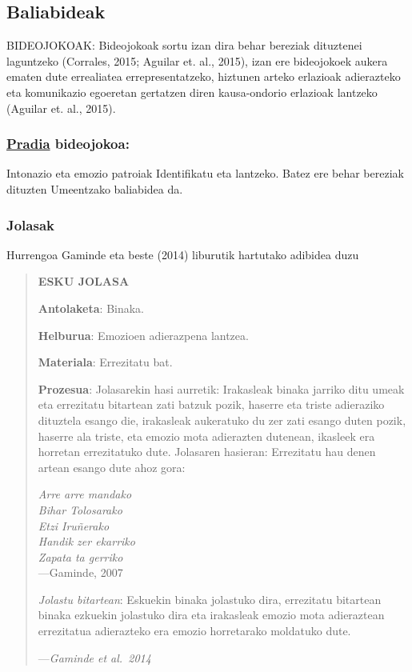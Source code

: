 \documentclass[]{book}
\begin{document}
\hypertarget{baliabideak}{%
\subsection{Baliabideak}\label{baliabideak}}

BIDEOJOKOAK: Bideojokoak sortu izan dira behar bereziak dituztenei
laguntzeko (Corrales, 2015; Aguilar et. al., 2015), izan ere bideojokoek aukera
ematen dute errealiatea errepresentatzeko, hiztunen arteko erlazioak
adierazteko eta komunikazio egoeretan gertatzen diren kausa-ondorio erlazioak
lantzeko (Aguilar et. al., 2015).

\hypertarget{pradia-bideojokoa}{%
\subsubsection{\texorpdfstring{\href{http://pradia.net/}{Pradia} bideojokoa:}{Pradia bideojokoa:}}\label{pradia-bideojokoa}}

Intonazio eta emozio patroiak
Identifikatu eta lantzeko.
Batez ere behar bereziak dituzten
Umeentzako baliabidea da.

\hypertarget{jolasak}{%
\subsubsection{Jolasak}\label{jolasak}}

Hurrengoa Gaminde eta beste (2014) liburutik hartutako adibidea duzu

\begin{quote}
\textbf{ESKU JOLASA}

\textbf{Antolaketa}: Binaka.

\textbf{Helburua}: Emozioen adierazpena lantzea.

\textbf{Materiala}: Errezitatu bat.

\textbf{Prozesua}: Jolasarekin hasi aurretik: Irakasleak binaka jarriko ditu umeak
eta errezitatu bitartean zati batzuk pozik, haserre eta triste adieraziko
dituztela esango die, irakasleak aukeratuko du zer zati esango duten
pozik, haserre ala triste, eta emozio mota adierazten dutenean, ikasleek
era horretan errezitatuko dute.
Jolasaren hasieran: Errezitatu hau denen artean esango dute ahoz
gora:

\emph{Arre arre mandako\\
Bihar Tolosarako\\
Etzi Iruñerako\\
Handik zer ekarriko\\
Zapata ta gerriko}\\
---Gaminde, 2007

\emph{Jolastu bitartean}: Eskuekin binaka jolastuko dira, errezitatu bitartean
binaka ezkuekin jolastuko dira eta irakasleak emozio mota adieraztean
errezitatua adierazteko era emozio horretarako moldatuko dute.

---\emph{Gaminde et al.~2014}
\end{quote}
\end{document}
